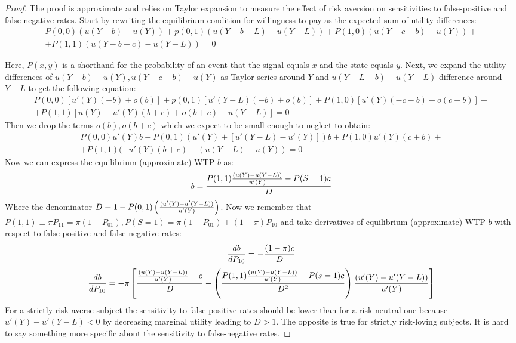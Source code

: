 \documentclass[12pt,a4paper]{article}
\begin{document}
\begin{proof}

The proof is approximate and relies on Taylor expansion to measure the effect of risk aversion on sensitivities to false-positive and false-negative rates. Start by rewriting the equilibrium condition for willingness-to-pay as the expected sum of utility differences:
\begin{equation}
\begin{split}
P(0,0) (u(Y-b)-u(Y))+p(0,1)(u(Y-b-L)-u(Y-L))+P(1,0)(u(Y-c-b)-u(Y))+\\+P(1,1)(u(Y-b-c)-u(Y-L))=0
\end{split}
\end{equation}

Here, $P(x,y)$ is a shorthand for the probability of an event that the signal equals $x$ and the state equals $y$. Next, we expand the utility differences of $u(Y-b)-u(Y), u(Y-c-b)-u(Y)$ as Taylor series around $Y$ and $u(Y-L-b)-u(Y-L)$ difference around $Y-L$ to get the following equation:\begin{equation}
\begin{split}
P(0,0) [u'(Y)(-b)+o(b)]+p(0,1)[u'(Y-L)(-b)+o(b)]+P(1,0)[u'(Y)(-c-b)+o(c+b)]+\\+P(1,1)[u(Y)-u'(Y)(b+c)+o(b+c)-u(Y-L)]=0
\end{split}
\end{equation}
Then we drop the terms $o(b), o(b+c)$ which we expect to be small enough to neglect to obtain:
\begin{equation}
\begin{split}
P(0,0)u'(Y)b+P(0,1)(u'(Y)+[u'(Y-L)-u'(Y)])b+P(1,0)u'(Y)(c+b)+\\+P(1,1)(-u'(Y)(b+c)-(u(Y-L)-u(Y))=0
\end{split}
\end{equation}
Now we can express the equilibrium (approximate) WTP $b$ as:
\[b={ P(1,1){(u(Y)-u(Y-L)) \over u'(Y)}-P(S=1)c \over D} \]
Where the denominator $D\equiv 1-P(0,1)\left({(u'(Y)-u'(Y-L))\over u'(Y)}\right)$. Now we remember that $P(1,1) \equiv \pi P_{11}=\pi (1-P_{01}), P(S=1)=\pi (1-P_{01})+(1-\pi)P_{10}$ and take derivatives of equilibrium (approximate) WTP $b$ with respect to false-positive and false-negative rates:
\[{db \over dP_{10}}=-{(1-\pi)c \over D} \]
\[{db \over dP_{10}}=-\pi \left[ {{(u(Y)-u(Y-L)) \over u'(Y)}-c \over D}-\left({P(1,1){(u(Y)-u(Y-L)) \over u'(Y)}-P(s=1)c \over D^2}\right) {(u'(Y)-u'(Y-L))\over u'(Y)} \right] \]
For a strictly risk-averse subject the sensitivity to false-positive rates should be lower than for a risk-neutral one because $u'(Y)-u'(Y-L)<0$ by decreasing marginal utility leading to $D>1$. The opposite is true for strictly risk-loving subjects. It is hard to say something more specific about the sensitivity to false-negative rates. 


\end{proof}
\end{document}
